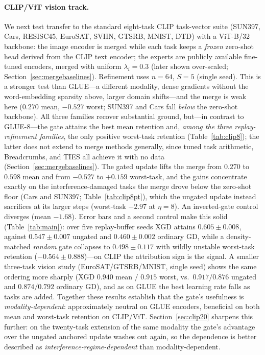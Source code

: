 \documentclass{article} %
\begin{document}
\paragraph{CLIP/ViT vision track.}
We next test transfer to the standard eight-task CLIP task-vector suite (SUN397, Cars, RESISC45, EuroSAT, SVHN, GTSRB, MNIST, DTD) with a ViT-B/32 backbone: the image encoder is merged while each task keeps a \emph{frozen} zero-shot head derived from the CLIP text encoder; the experts are publicly available fine-tuned encoders, merged with uniform $\lambda_i=0.3$ (later shown over-scaled; Section~\ref{sec:mergebaselines}). Refinement uses $n=64$, $S=5$ (single seed). This is a stronger test than GLUE---a different modality, dense gradients without the word-embedding sparsity above, larger domain shifts---and the merge is weak here ($0.270$ mean, $-0.527$ worst; SUN397 and Cars fall \emph{below} the zero-shot backbone). All three families recover substantial ground, but---in contrast to GLUE-8---the gate attains the best mean retention and, \emph{among the three replay-refinement families}, the only positive worst-task retention (Table~\ref{tab:clip8}); the latter does not extend to merge methods generally, since tuned task arithmetic, Breadcrumbs, and TIES all achieve it with no data (Section~\ref{sec:mergebaselines}). The gated update lifts the merge from $0.270$ to $0.598$ mean and from $-0.527$ to $+0.159$ worst-task, and the gains concentrate exactly on the interference-damaged tasks the merge drove below the zero-shot floor (Cars and SUN397; Table~\ref{tab:clip8pt}), which the ungated update instead sacrifices at its larger steps (worst-task $-2.97$ at $\eta=8$). An inverted-gate control diverges (mean $-1.68$). Error bars and a second control make this solid (Table~\ref{tab:main}): over five replay-buffer seeds XGD attains $0.605\pm0.008$, against $0.547\pm0.007$ ungated and $0.460\pm0.002$ ordinary GD, while a density-matched \emph{random} gate collapses to $0.498\pm0.117$ with wildly unstable worst-task retention ($-0.564\pm0.888$)---on CLIP the attribution sign is the signal. A smaller three-task vision study (EuroSAT/GTSRB/MNIST, single seed) shows the same ordering more sharply (XGD $0.940$ mean / $0.915$ worst, vs.\ $0.917/0.876$ ungated and $0.874/0.792$ ordinary GD), and as on GLUE the best learning rate falls as tasks are added. Together these results establish that the gate's usefulness is \emph{modality-dependent}: approximately neutral on GLUE encoders, beneficial on both mean and worst-task retention on CLIP/ViT. Section~\ref{sec:clip20} sharpens this further: on the twenty-task extension of the same modality the gate's advantage over the ungated anchored update washes out again, so the dependence is better described as \emph{interference-regime-dependent} than modality-dependent.
\end{document}
